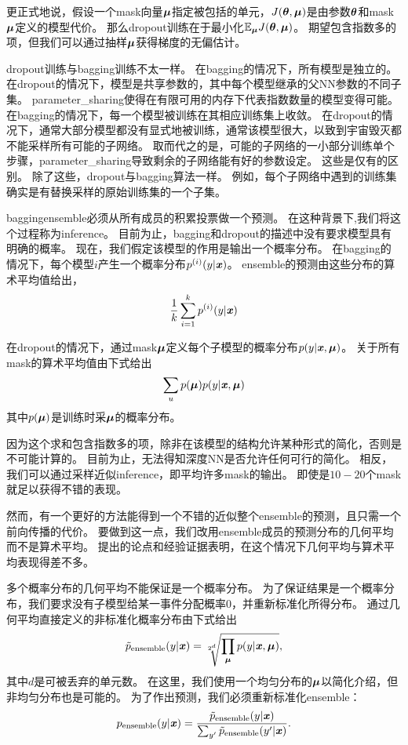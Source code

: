 更正式地说，假设一个\gls{mask}向量$\boldsymbol{\mu}$指定被包括的单元，$J(\boldsymbol{\theta}, \boldsymbol{\mu})$是由参数$\boldsymbol{\theta}$和\gls{mask}$\boldsymbol{\mu}$定义的模型代价。
那么\gls{dropout}训练在于最小化$\mathbb{E}_{\boldsymbol{\mu}} J(\boldsymbol{\theta}, \boldsymbol{\mu})$。 
期望包含指数多的项，但我们可以通过抽样$\boldsymbol{\mu}$获得梯度的无偏估计。

\gls{dropout}训练与\gls{bagging}训练不太一样。
在\gls{bagging}的情况下，所有模型是独立的。
在\gls{dropout}的情况下，模型是共享参数的，其中每个模型继承的父\gls{NN}参数的不同子集。
\gls{parameter_sharing}使得在有限可用的内存下代表指数数量的模型变得可能。
在\gls{bagging}的情况下，每一个模型被训练在其相应训练集上收敛。
在\gls{dropout}的情况下，通常大部分模型都没有显式地被训练，通常该模型很大，以致到宇宙毁灭都不能采样所有可能的子网络。
取而代之的是，可能的子网络的一小部分训练单个步骤，\gls{parameter_sharing}导致剩余的子网络能有好的参数设定。
这些是仅有的区别。
除了这些，\gls{dropout}与\gls{bagging}算法一样。
例如，每个子网络中遇到的训练集确实是有替换采样的原始训练集的一个子集。

\gls{bagging}\gls{ensemble}必须从所有成员的积累投票做一个预测。
在这种背景下,我们将这个过程称为\gls{inference}。
目前为止，\gls{bagging}和\gls{dropout}的描述中没有要求模型具有明确的概率。
现在，我们假定该模型的作用是输出一个概率分布。
在\gls{bagging}的情况下，每个模型$i$产生一个概率分布$p^{(i)}(y | \boldsymbol{\mathit{x}})$。 
\gls{ensemble}的预测由这些分布的算术平均值给出，
\begin{align}
 \frac{1}{k} \sum_{i=1}^k p^{(i)}(y | \boldsymbol{\mathit{x}})
\end{align}

在\gls{dropout}的情况下，通过\gls{mask}$\boldsymbol{\mu}$定义每个子模型的概率分布$p(y | \boldsymbol{\mathit{x}}, \boldsymbol{\mu})$。
关于所有\gls{mask}的算术平均值由下式给出
\begin{align}
  \sum_{u} p(\boldsymbol{\mu}) p(y | \boldsymbol{\mathit{x}}, \boldsymbol{\mu})
\end{align}
其中$p(\boldsymbol{\mu})$是训练时采$\boldsymbol{\mu}$的概率分布。


因为这个求和包含指数多的项，除非在该模型的结构允许某种形式的简化，否则是不可能计算的。
目前为止，无法得知深度\gls{NN}是否允许任何可行的简化。
相反，我们可以通过采样近似\gls{inference}，即平均许多\gls{mask}的输出。
即使是$10-20$个\gls{mask}就足以获得不错的表现。

然而，有一个更好的方法能得到一个不错的近似整个\gls{ensemble}的预测，且只需一个前向传播的代价。
要做到这一点，我们改用\gls{ensemble}成员的预测分布的几何平均而不是算术平均。
\cite{WardeFarley+al-ICLR2014}提出的论点和经验证据表明，在这个情况下几何平均与算术平均表现得差不多。

多个概率分布的几何平均不能保证是一个概率分布。
为了保证结果是一个概率分布，我们要求没有子模型给某一事件分配概率0，并重新标准化所得分布。
通过几何平均直接定义的非标准化概率分布由下式给出
\begin{align}
\tilde{p}_{\text{ensemble}}(y | \boldsymbol{\mathit{x}}) = \sqrt[2^d]{\prod_{\boldsymbol{\mu}} p(y | \boldsymbol{\mathit{x}}, \boldsymbol{\mu})},
\end{align}
其中$d$是可被丢弃的单元数。
在这里，我们使用一个均匀分布的$\boldsymbol{\mu}$以简化介绍，但非均匀分布也是可能的。
为了作出预测，我们必须重新标准化\gls{ensemble}：
\begin{align}
p_{\text{ensemble}}(y | \boldsymbol{\mathit{x}})  = \frac{\tilde{p}_{\text{ensemble}}(y | \boldsymbol{\mathit{x}})}
 {\sum_{y'}\tilde{p}_{\text{ensemble}}(y' | \boldsymbol{\mathit{x}}) }.
\end{align}
 
